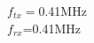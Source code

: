 \documentclass[preview]{standalone}
\begin{document}
\begin{center}
$f_{tx}=$0.41MHz\\$f_{rx}$=0.41MHz
\end{center}
\end{document}
